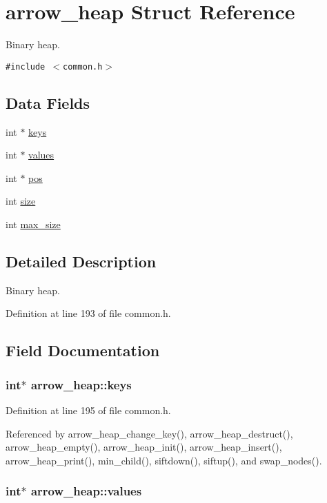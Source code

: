 \hypertarget{structarrow__heap}{
\section{arrow\_\-heap Struct Reference}
\label{structarrow__heap}
}
Binary heap.  


{\tt \#include $<$common.h$>$}

\subsection*{Data Fields}
\begin{CompactItemize}
\item 
int $\ast$ \hyperlink{structarrow__heap_663da189690098d1ad1bbc04701402f2}{keys}
\item 
int $\ast$ \hyperlink{structarrow__heap_e2641f7a933ecb92d32acd3a50caa442}{values}
\item 
int $\ast$ \hyperlink{structarrow__heap_a39c7b18964b26c78a96f51406d8d7ab}{pos}
\item 
int \hyperlink{structarrow__heap_afeff09d63b1f6ec6fc910d3407972de}{size}
\item 
int \hyperlink{structarrow__heap_e668dd3f450ba07df5998b8d084e6949}{max\_\-size}
\end{CompactItemize}


\subsection{Detailed Description}
Binary heap. 

Definition at line 193 of file common.h.

\subsection{Field Documentation}
\hypertarget{structarrow__heap_663da189690098d1ad1bbc04701402f2}{
\subsubsection{\setlength{\rightskip}{0pt plus 5cm}int$\ast$ {\bf arrow\_\-heap::keys}}}
\label{structarrow__heap_663da189690098d1ad1bbc04701402f2}




Definition at line 195 of file common.h.

Referenced by arrow\_\-heap\_\-change\_\-key(), arrow\_\-heap\_\-destruct(), arrow\_\-heap\_\-empty(), arrow\_\-heap\_\-init(), arrow\_\-heap\_\-insert(), arrow\_\-heap\_\-print(), min\_\-child(), siftdown(), siftup(), and swap\_\-nodes().\hypertarget{structarrow__heap_e2641f7a933ecb92d32acd3a50caa442}{
\subsubsection{\setlength{\rightskip}{0pt plus 5cm}int$\ast$ {\bf arrow\_\-heap::values}}}
\label{structarrow__heap_e2641f7a933ecb92d32acd3a50caa442}




